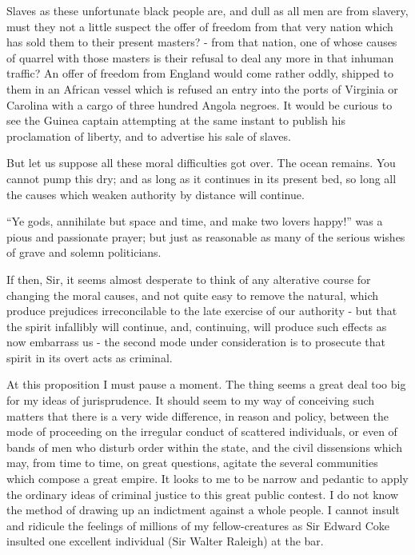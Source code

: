 Slaves as these unfortunate black people are, and dull as all men are from slavery, must they not a little suspect the offer of freedom from that very nation which has sold them to their present masters? - from that nation, one of whose causes of quarrel with those masters is their refusal to deal any more in that inhuman traffic? An offer of freedom from England would come rather oddly, shipped to them in an African vessel which is refused an entry into the ports of Virginia or Carolina with a cargo of three hundred Angola negroes. It would be curious to see the Guinea captain attempting at the same instant to publish his proclamation of liberty, and to advertise his sale of slaves.\par

But let us suppose all these moral difficulties got over. The ocean remains. You cannot pump this dry; and as long as it continues in its present bed, so long all the causes which weaken authority by distance will continue.\par

“Ye gods, annihilate but space and time, and make two lovers happy!” was a pious and passionate prayer; but just as reasonable as many of the serious wishes of grave and solemn politicians.\par

If then, Sir, it seems almost desperate to think of any alterative course for changing the moral causes, and not quite easy to remove the natural, which produce prejudices irreconcilable to the late exercise of our authority - but that the spirit infallibly will continue, and, continuing, will produce such effects as now embarrass us - the second mode under consideration is to prosecute that spirit in its overt acts as criminal.\par

At this proposition I must pause a moment. The thing seems a great deal too big for my ideas of jurisprudence. It should seem to my way of conceiving such matters that there is a very wide difference, in reason and policy, between the mode of proceeding on the irregular conduct of scattered individuals, or even of bands of men who disturb order within the state, and the civil dissensions which may, from time to time, on great questions, agitate the several communities which compose a great empire. It looks to me to be narrow and pedantic to apply the ordinary ideas of criminal justice to this great public contest. I do not know the method of drawing up an indictment against a whole people. I cannot insult and ridicule the feelings of millions of my fellow-creatures as Sir Edward Coke insulted one excellent individual (Sir Walter Raleigh) at the bar.\par

